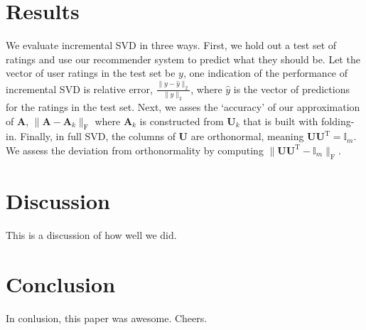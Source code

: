 \documentclass{article} %
\newcommand{\A}{\mathbf{A}}
\newcommand{\T}{\textrm{T}}
\begin{document}
\section{Results}

We evaluate incremental SVD in three ways. 
First, we hold out a test set of ratings and use our recommender system to predict what they should be.
Let the vector of user ratings in the test set be $y$, one indication of 
the performance of incremental SVD is relative error, $\frac{\|y - \hat{y}\|_2}{\|y\|_2}$, where $\hat{y}$ is the vector of predictions for the ratings in the test set.
Next, we asses the `accuracy' of our approximation of $\A$, $\|\A - \A_k\|_{\textrm{F}}$ where $\A_k$ is constructed from $\mathbf{U}_k$ that is built with folding-in.
Finally, in full SVD, the columns of $\mathbf{U}$ are orthonormal, meaning $\mathbf{U}\mathbf{U}^{\T} = \mathbb{I}_m$. 
We assess the deviation from orthonormality by computing $\|\mathbf{U}\mathbf{U}^{\T} - \mathbb{I}_m\|_{\textrm{F}}$.

\section{Discussion}
This is a discussion of how well we did.

\section{Conclusion}
In conlusion, this paper was awesome. Cheers.



\end{document}

